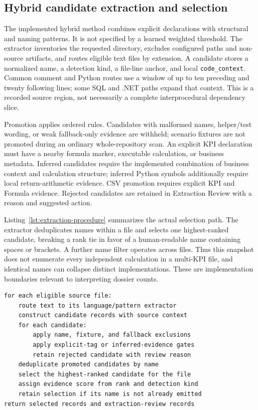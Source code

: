\documentclass[a4paper,fleqn]{cas-dc}
\begin{document}
\subsection{Hybrid candidate extraction and selection}
\label{sec:extraction}

The implemented hybrid method combines explicit declarations with structural and naming patterns. It is not specified by a learned weighted threshold. The extractor inventories the requested directory, excludes configured paths and non-source artifacts, and routes eligible text files by extension. A candidate stores a normalized name, a detection kind, a file-line anchor, and local \texttt{code\_context}. Common comment and Python routes use a window of up to ten preceding and twenty following lines; some SQL and .NET paths expand that context. This is a recorded source region, not necessarily a complete interprocedural dependency slice.

Promotion applies ordered rules. Candidates with malformed names, helper/test wording, or weak fallback-only evidence are withheld; scenario fixtures are not promoted during an ordinary whole-repository scan. An explicit KPI declaration must have a nearby formula marker, executable calculation, or business metadata. Inferred candidates require the implemented combination of business context and calculation structure; inferred Python symbols additionally require local return-arithmetic evidence. CSV promotion requires explicit KPI and Formula evidence. Rejected candidates are retained in Extraction Review with a reason and suggested action.

Listing~\ref{lst:extraction-procedure} summarizes the actual selection path. The extractor deduplicates names within a file and selects one highest-ranked candidate, breaking a rank tie in favor of a human-readable name containing spaces or brackets. A further name filter operates across files. Thus this snapshot does not enumerate every independent calculation in a multi-KPI file, and identical names can collapse distinct implementations. These are implementation boundaries relevant to interpreting dossier counts.

\begin{lstlisting}[language={},numbers=none,basicstyle=\ttfamily\scriptsize,caption={Source-faithful summary of the frozen candidate-selection procedure.},label={lst:extraction-procedure}]
for each eligible source file:
    route text to its language/pattern extractor
    construct candidate records with source context
    for each candidate:
        apply name, fixture, and fallback exclusions
        apply explicit-tag or inferred-evidence gates
        retain rejected candidate with review reason
    deduplicate promoted candidates by name
    select the highest-ranked candidate for the file
    assign evidence score from rank and detection kind
    retain selection if its name is not already emitted
return selected records and extraction-review records
\end{lstlisting}
\end{document}
